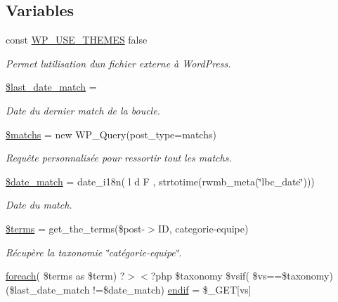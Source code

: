 \subsection*{Variables}
\begin{DoxyCompactItemize}
\item 
const \hyperlink{tri-categorie-match_8php_ae50604b6dd85409f240bf13253215ba4}{W\+P\+\_\+\+U\+S\+E\+\_\+\+T\+H\+E\+M\+ES} false
\begin{DoxyCompactList}\small\item\em Permet l\textquotesingle{}utilisation d\textquotesingle{}un fichier externe à Word\+Press. \end{DoxyCompactList}\item 
\hyperlink{tri-categorie-match_8php_ae59c5fee360f6a47ff7e4847a26a6509}{\$last\+\_\+date\+\_\+match} = \textquotesingle{}\textquotesingle{}
\begin{DoxyCompactList}\small\item\em Date du dernier match de la boucle. \end{DoxyCompactList}\item 
\hyperlink{tri-categorie-match_8php_a957f8b9f1c1240556780615c84d85db3}{\$matchs} = new W\+P\+\_\+\+Query(\textquotesingle{}post\+\_\+type=matchs\textquotesingle{})
\begin{DoxyCompactList}\small\item\em Requête personnalisée pour ressortir tout les matchs. \end{DoxyCompactList}\item 
\hyperlink{tri-categorie-match_8php_a9dccec06b3547f7c82bc8ade68a042a5}{\$date\+\_\+match} = date\+\_\+i18n(\textquotesingle{} l d F \textquotesingle{}, strtotime(rwmb\+\_\+meta(\char`\"{}lbc\+\_\+date\char`\"{})))
\begin{DoxyCompactList}\small\item\em Date du match. \end{DoxyCompactList}\item 
\hyperlink{tri-categorie-match_8php_ad6d756efb764174cfe7a6e9abc97e3eb}{\$terms} = get\+\_\+the\+\_\+terms(\$post-\/$>$ID, \textquotesingle{}categorie-\/equipe\textquotesingle{})
\begin{DoxyCompactList}\small\item\em Récupère la taxonomie \char`\"{}catégorie-\/equipe\char`\"{}. \end{DoxyCompactList}\item 
\hyperlink{single-matchs_8php_acef14cb9dd3a31dcc9b59c773f76807e}{foreach}( \$terms as \$term) ?$>$$<$?php \$taxonomy \$vsif( \$vs==\$taxonomy)(\$last\+\_\+date\+\_\+match !=\$date\+\_\+match) \hyperlink{tri-categorie-match_8php_a82cd33ca97ff99f2fcc5e9c81d65251b}{endif} = \$\+\_\+\+G\+ET\mbox{[}\textquotesingle{}vs\textquotesingle{}\mbox{]}
$$
\end{DoxyCompactItemize}

